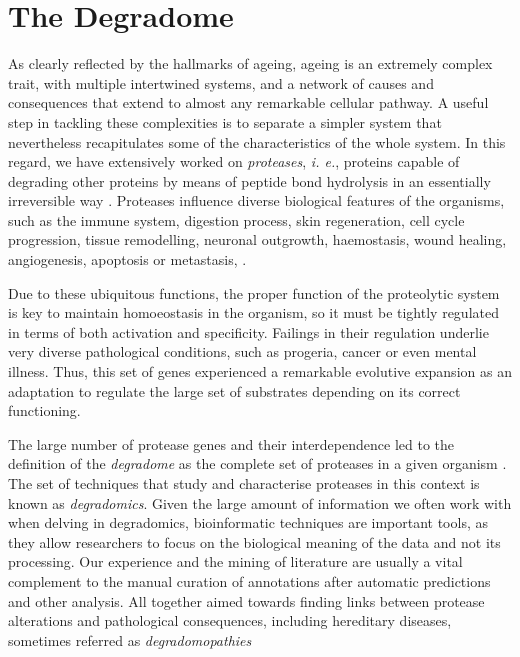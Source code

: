 %

\section{The Degradome}

As clearly reflected by the hallmarks of ageing, ageing is an extremely complex trait, with multiple intertwined systems, and a network of causes and consequences that extend to almost any remarkable cellular pathway.
A useful step in tackling these complexities is to separate a simpler system that nevertheless recapitulates some of the characteristics of the whole system.
In this regard, we have extensively worked on \emph{proteases}, \textit{i. e.}, proteins capable of degrading other proteins by means of peptide bond hydrolysis in an essentially irreversible way \cite{Perez-Silva2015}.
Proteases influence diverse biological features of the organisms, such as the immune system, digestion process, skin regeneration, cell cycle progression, tissue remodelling, neuronal outgrowth, haemostasis, wound healing, angiogenesis, apoptosis or metastasis, \cite{Lopez-Otin2008,Quiros2015,Reinhard2015,Voskoboinik2015}.

Due to these ubiquitous functions, the proper function of the proteolytic system is key to maintain homoeostasis in the organism, so it must be tightly regulated in terms of both activation and specificity.
Failings in their regulation underlie very diverse pathological conditions, such as progeria, cancer or even mental illness\cite{Turk2012}.
Thus, this set of genes experienced a remarkable evolutive expansion as an adaptation to regulate the large set of substrates depending on its correct functioning.

The large number of protease genes \cite{Perez-Silva2015} and their interdependence led to the definition of the \emph{degradome} as the complete set of proteases in a given organism \cite{Lopez-Otin2002a}.
The set of techniques that study and characterise proteases in this context is known as \emph{degradomics}. 
Given the large amount of information we often work with when delving in degradomics, bioinformatic techniques are important tools, as they allow researchers to focus on the biological meaning of the data and not its processing. 
Our experience and the mining of literature are usually a vital complement to the manual curation of annotations after automatic predictions and other analysis.
All together aimed towards finding links between protease alterations and pathological consequences, including hereditary diseases, sometimes referred as \emph{degradomopathies} \cite{Quesada2009}

